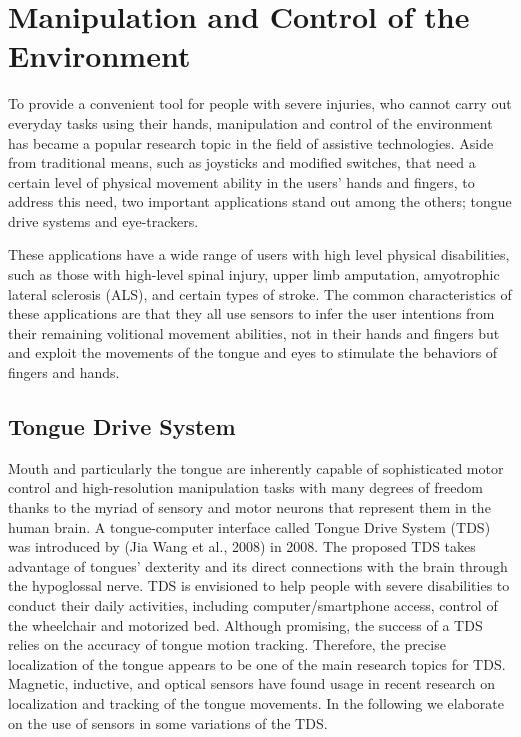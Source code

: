 \section{Manipulation and Control of the Environment}

To provide a convenient tool for people with severe injuries, who cannot carry out everyday tasks using their hands, manipulation and control of the environment has became a popular research topic in the field of assistive technologies. Aside from traditional means, such as joysticks and modified switches, that need a certain level of physical movement ability in the users' hands and fingers, to address this need, two important applications stand out among the others; tongue drive systems and eye-trackers.

These applications have a wide range of users with high level physical disabilities, such as those with high-level spinal injury, upper limb amputation, amyotrophic lateral sclerosis (ALS), and certain types of stroke. The common characteristics of these applications are that they all use sensors to infer the user intentions from their remaining volitional movement abilities, not in their hands and fingers but and exploit the movements of the tongue and eyes to stimulate the behaviors of fingers and hands.

\subsection{Tongue Drive System}
Mouth and particularly the tongue are inherently capable of sophisticated motor control and high-resolution manipulation tasks with many degrees of freedom thanks to the myriad of sensory and motor neurons that represent them in the human brain. A tongue-computer interface called Tongue Drive System (TDS) was introduced by (Jia Wang et al., 2008) in 2008. The proposed TDS takes advantage of tongues' dexterity and its direct  connections with the brain through the hypoglossal nerve. TDS is envisioned to help people with severe disabilities to conduct their daily activities, including computer/smartphone access, control of the wheelchair and motorized bed. Although promising, the success of a TDS relies on the accuracy of tongue motion tracking. Therefore, the precise localization of the tongue appears to be one of the main research topics for TDS. Magnetic, inductive, and optical sensors have found usage in recent research on localization and tracking of the tongue movements. In the following we elaborate on the use of sensors in some variations of the TDS.

